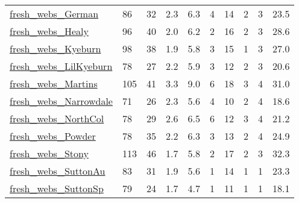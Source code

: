\begin{longtable}{llllllllll}
 \href{https://iwdb.nceas.ucsb.edu/html/thomps_towns.html}{fresh\_webs\_German}                                               & 86         & 32    & 2.3    & 6.3    & 4     & 14     & 2      & 3      & 23.5    \\
 \href{https://iwdb.nceas.ucsb.edu/html/thomps_towns.html}{fresh\_webs\_Healy}                                                & 96         & 40    & 2.0    & 6.2    & 2     & 16     & 2      & 3      & 28.6    \\
 \href{https://iwdb.nceas.ucsb.edu/html/thomps_towns.html}{fresh\_webs\_Kyeburn}                                              & 98         & 38    & 1.9    & 5.8    & 3     & 15     & 1      & 3      & 27.0    \\
 \href{https://iwdb.nceas.ucsb.edu/html/thomps_towns.html}{fresh\_webs\_LilKyeburn}                                           & 78         & 27    & 2.2    & 5.9    & 3     & 12     & 2      & 3      & 20.6    \\
 \href{https://iwdb.nceas.ucsb.edu/html/thomps_towns.html}{fresh\_webs\_Martins}                                              & 105        & 41    & 3.3    & 9.0    & 6     & 18     & 3      & 4      & 31.0    \\
 \href{https://iwdb.nceas.ucsb.edu/html/thomps_towns.html}{fresh\_webs\_Narrowdale}                                           & 71         & 26    & 2.3    & 5.6    & 4     & 10     & 2      & 4      & 18.6    \\
 \href{https://iwdb.nceas.ucsb.edu/html/thomps_towns.html}{fresh\_webs\_NorthCol}                                             & 78         & 29    & 2.6    & 6.5    & 6     & 12     & 3      & 4      & 21.2    \\
 \href{https://iwdb.nceas.ucsb.edu/html/thomps_towns.html}{fresh\_webs\_Powder}                                               & 78         & 35    & 2.2    & 6.3    & 3     & 13     & 2      & 4      & 24.9    \\
 \href{https://iwdb.nceas.ucsb.edu/html/thomps_towns.html}{fresh\_webs\_Stony}                                                & 113        & 46    & 1.7    & 5.8    & 2     & 17     & 2      & 3      & 32.3    \\
 \href{https://iwdb.nceas.ucsb.edu/html/thomps_towns.html}{fresh\_webs\_SuttonAu}                                             & 83         & 31    & 1.9    & 5.6    & 1     & 14     & 1      & 1      & 23.3    \\
 \href{https://iwdb.nceas.ucsb.edu/html/thomps_towns.html}{fresh\_webs\_SuttonSp}                                             & 79         & 24    & 1.7    & 4.7    & 1     & 11     & 1      & 1      & 18.1    \\

\end{longtable}
